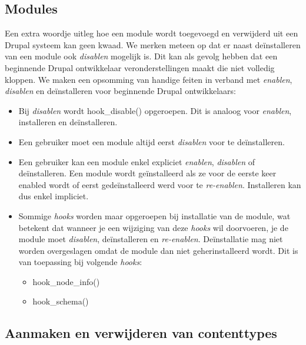 \subsection{Modules}
Een extra woordje uitleg hoe een module wordt toegevoegd en verwijderd uit een Drupal systeem kan geen kwaad. We merken meteen op dat er naast de\"{i}nstalleren van een module ook \textit{disablen} mogelijk is. Dit kan als gevolg hebben dat een beginnende Drupal ontwikkelaar veronderstellingen maakt die niet volledig kloppen. We maken een opsomming van handige feiten in verband met \textit{enablen}, \textit{disablen} en de\"{i}nstalleren voor beginnende Drupal ontwikkelaars:
\begin{itemize}
\item Bij \textit{disablen} wordt hook\_disable() opgeroepen. Dit is analoog voor \textit{enablen}, installeren en de\"{i}nstalleren.
\item Een gebruiker moet een module altijd eerst \textit{disablen} voor te de\"{i}nstalleren.
\item Een gebruiker kan een module enkel expliciet \textit{enablen}, \textit{disablen} of de\"{i}nstalleren. Een module wordt ge\"{i}nstalleerd als ze voor de eerste keer enabled wordt of eerst gede\"{i}nstalleerd werd voor te \textit{re-enablen}. Installeren kan dus enkel impliciet.
\item Sommige \textit{hooks} worden maar opgeroepen bij installatie van de module, wat betekent dat wanneer je een wijziging van deze \textit{hooks} wil doorvoeren, je de module moet \textit{disablen}, de\"{i}nstalleren en \textit{re-enablen}. De\"{i}nstallatie mag niet worden overgeslagen omdat de module dan niet geherinstalleerd wordt. Dit is van toepassing bij volgende \textit{hooks}:
\begin{itemize}
\item hook\_node\_info()
\item hook\_schema()
\end{itemize}
\end{itemize}

\subsection{Aanmaken en verwijderen van contenttypes}\label{contenttypeManipulatie}
